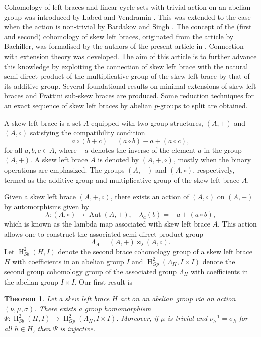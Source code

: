 \documentclass[11pt]{amsart}
\theoremstyle{thrm}
\theoremstyle{plain}
\newtheorem{thm}{Theorem}[section]
\theoremstyle{definition}
\newcommand{\Ho}{\operatorname{H} }
\numberwithin{equation}{section}
\begin{document}
Cohomology of left braces and linear cycle sets with trivial action on  an abelian group was introduced  by Labed and Vendramin  \cite{LV16} .  This was extended to the case when the action is non-trivial by Bardakov and Singh \cite{BS21}. The concept of the (first and second) cohomology of skew left braces,  originated from the article \cite{DB18}  by Bachiller, was formalised by the authors of the present article in \cite{RY24}.  Connection with extension theory was developed. The aim of this article is to further advance this knowledge by exploiting the connection of skew left brace with the natural semi-direct product of the multiplicative group of the skew left brace by that of its additive group. Several foundational results on minimal extensions of skew left braces and Frattini sub-skew braces are produced. Some reduction techniques for an exact sequence of skew left braces  by abelian $p$-groups to split are obtained.
	

A skew left brace is a set \(A\) equipped with two group structures, \((A, +)\) and \((A, \circ)\) satisfying the compatibility condition
\[
a\circ (b  +  c) = (a \circ b) - a + (a \circ c),\]
for all \( a,b,c \in A\), where \(- a\) denotes the inverse of the element $a$ in the group \((A, +)\).  A skew left brace $A$ is denoted by $(A, +, \circ)$, mostly when the binary operations are emphasized.  The groups  \((A, +)\) and \((A, \circ)\), respectively, termed as the additive group and multiplicative group of the skew left brace $A$.


Given a skew left brace $(A, +, \circ)$, there exists an action of $(A, \circ)$ on $(A, +)$ by automorphisms given by
\[
\lambda: (A, \circ) \to \operatorname{Aut} (A, +), \quad \lambda_a(b) = -a + (a \circ b),
\]
which is known as the lambda map associated with skew left brace $A$. This action allows one to construct the associated semi-direct product group 
\[
\Lambda_A = (A, +) \rtimes_{\lambda} (A, \circ).
\]
Let $\Ho^2_{Sb}(H, I)$ denote the second brace cohomology group of a skew left brace $H$ with coefficients in an abelian group $I$ and  $\Ho^2_{Gp}(\Lambda_H, I \times I)$  denote the second group cohomology group of the associated group $\Lambda_H$ with coefficients in the  abelian group $I \times I$.
Our first result is
\begin{thm}
Let a skew left brace $H$ act on an abelian group via an action $(\nu, \mu, \sigma)$. There exists a group homomorphism  $\Psi : \Ho^2_{Sb}(H, I) \to \Ho^2_{Gp}(\Lambda_H, I \times I)$. Moreover, if   $\mu$ is trivial and $\nu^{-1}_h = \sigma_h$ for all $h \in H$, then $\Psi$ is injective.
\end{thm}
\end{document}
